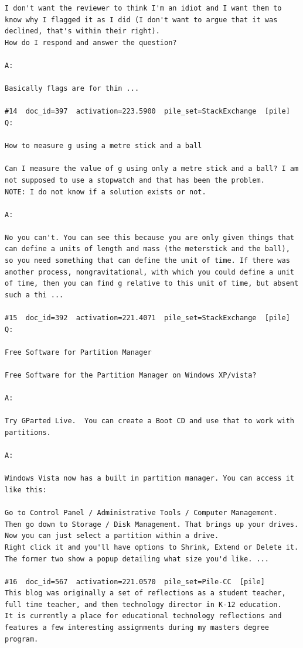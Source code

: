 \begin{verbatim}
I don't want the reviewer to think I'm an idiot and I want them to know why I flagged it as I did (I don't want to argue that it was declined, that's within their right).
How do I respond and answer the question?

A:

Basically flags are for thin ...

#14  doc_id=397  activation=223.5900  pile_set=StackExchange  [pile]
Q:

How to measure g using a metre stick and a ball

Can I measure the value of g using only a metre stick and a ball? I am not supposed to use a stopwatch and that has been the problem.
NOTE: I do not know if a solution exists or not.

A:

No you can't. You can see this because you are only given things that can define a units of length and mass (the meterstick and the ball), so you need something that can define the unit of time. If there was another process, nongravitational, with which you could define a unit of time, then you can find g relative to this unit of time, but absent such a thi ...

#15  doc_id=392  activation=221.4071  pile_set=StackExchange  [pile]
Q:

Free Software for Partition Manager

Free Software for the Partition Manager on Windows XP/vista?  

A:

Try GParted Live.  You can create a Boot CD and use that to work with partitions.

A:

Windows Vista now has a built in partition manager. You can access it like this:

Go to Control Panel / Administrative Tools / Computer Management. 
Then go down to Storage / Disk Management. That brings up your drives. 
Now you can just select a partition within a drive.
Right click it and you'll have options to Shrink, Extend or Delete it. The former two show a popup detailing what size you'd like. ...

#16  doc_id=567  activation=221.0570  pile_set=Pile-CC  [pile]
This blog was originally a set of reflections as a student teacher, full time teacher, and then technology director in K-12 education.
It is currently a place for educational technology reflections and features a few interesting assignments during my masters degree program.


\end{verbatim}
